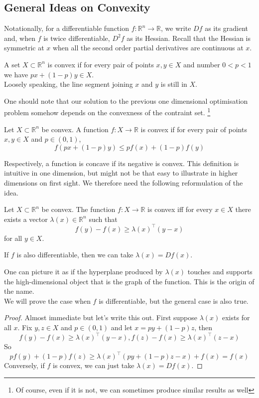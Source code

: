 \subsection{General Ideas on Convexity}
Notationally, for a differentiable function $f:\mathbb R^n\to\mathbb R$, we write $Df$ as its gradient and, when $f$ is twice differentiable, $D^2f$ as its Hessian.
Recall that the Hessian is symmetric at $x$ when all the second order partial derivatives are continuous at $x$.
\begin{definition}
    A set $X\subset\mathbb R^n$ is convex if for every pair of points $x,y\in X$ and number $0<p<1$ we have $px+(1-p)y\in X$.\\
    Loosely speaking, the line segment joining $x$ and $y$ is still in $X$.
\end{definition}
One should note that our solution to the previous one dimensional optimisation problem somehow depends on the convexness of the contraint set.
\footnote{Of course, even if it is not, we can sometimes produce similar results as well}
\begin{definition}
    Let $X\subset\mathbb R^n$ be convex.
    A function $f:X\to\mathbb R$ is convex if for every pair of points $x,y\in X$ and $p\in (0,1)$,
    $$f(px+(1-p)y)\le pf(x)+(1-p)f(y)$$
\end{definition}
Respectively, a function is concave if its negative is convex.
This definition is intuitive in one dimension, but might not be that easy to illustrate in higher dimensions on first sight.
We therefore need the following reformulation of the idea.
\begin{theorem}\label{hyperplane}
    Let $X\subset\mathbb R^n$ be convex.
    The function $f:X\to\mathbb R$ is convex iff for every $x\in X$ there exists a vector $\lambda(x)\in\mathbb R^n$ such that
    $$f(y)-f(x)\ge\lambda(x)^\top(y-x)$$
    for all $y\in X$.
\end{theorem}
\begin{remark}
    If $f$ is also differentiable, then we can take $\lambda(x)=Df(x)$.
\end{remark}
One can picture it as if the hyperplane produced by $\lambda(x)$ touches and supports the high-dimensional object that is the graph of the function.
This is the origin of the name.\\
We will prove the case when $f$ is differentiable, but the general case is also true.
\begin{proof}
    Almost immediate but let's write this out.
    First suppose $\lambda(x)$ exists for all $x$.
    Fix $y,z\in X$ and $p\in (0,1)$ and let $x=py+(1-p)z$, then
    $$f(y)-f(x)\ge\lambda(x)^\top(y-x),f(z)-f(x)\ge\lambda(x)^\top(z-x)$$
    So
    $$pf(y)+(1-p)f(z)\ge\lambda(x)^\top(py+(1-p)z-x)+f(x)=f(x)$$
    Conversely, if $f$ is convex, we can just take $\lambda(x)=Df(x)$.
\end{proof}
